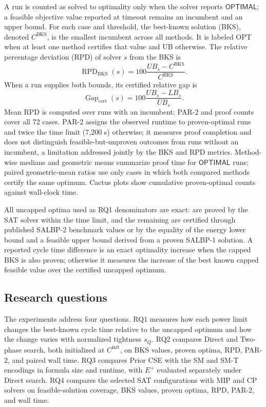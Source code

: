 \documentclass[]{interact}
\theoremstyle{plain}
\theoremstyle{definition}
\theoremstyle{remark}
\newcommand{\Cinit}{C^{\mathrm{init}}}
\newcommand{\Status}[1]{\ensuremath{\mathsf{#1}}}
\begin{document}
A run is counted as solved to optimality only when the solver reports \Status{OPTIMAL}; a feasible objective value reported at timeout remains an incumbent and an upper bound. For each case and threshold, the best-known solution (BKS), denoted $C^{\mathrm{BKS}}$, is the smallest incumbent across all methods. It is labeled OPT when at least one method certifies that value and UB otherwise. The relative percentage deviation (RPD) of solver $s$ from the BKS is
\begin{equation}
\operatorname{RPD}_{\mathrm{BKS}}(s)=
100\frac{UB_s-C^{\mathrm{BKS}}}{C^{\mathrm{BKS}}}.
\label{eq:rpd-bks}
\end{equation}
When a run supplies both bounds, its certified relative gap is
\begin{equation}
\operatorname{Gap}_{\mathrm{cert}}(s)=
100\frac{UB_s-LB_s}{UB_s}.
\label{eq:cert-gap}
\end{equation}
Mean RPD is computed over runs with an incumbent; PAR-2 and proof counts cover all 72 cases. PAR-2 assigns the observed runtime to proven-optimal runs and twice the time limit (7,200 s) otherwise; it measures proof completion and does not distinguish feasible-but-unproven outcomes from runs without an incumbent, a limitation addressed jointly by the BKS and RPD metrics. Method-wise medians and geometric means summarize proof time for \Status{OPTIMAL} runs; paired geometric-mean ratios use only cases in which both compared methods certify the same optimum. Cactus plots show cumulative proven-optimal counts against wall-clock time.

All \NoPeakOptCount{} uncapped optima used as RQ1 denominators are exact: \NoPeakSATProvenCount{} are proved by the SAT solver within the time limit, and the remaining \NoPeakExternalOnlyCount{} are certified through published SALBP-2 benchmark values \citep{SchollBenchmark1993} or by the equality of the energy lower bound and a feasible upper bound derived from a proven SALBP-1 solution. A reported cycle time difference is an exact optimality increase when the capped BKS is also proven; otherwise it measures the increase of the best known capped feasible value over the certified uncapped optimum.

\subsection{Research questions}

The experiments address four questions. RQ1 measures how each power limit changes the best-known cycle time relative to the uncapped optimum and how the change varies with normalized tightness $s_Q$. RQ2 compares Direct and Two-phase search, both initialized at $\Cinit$, on BKS values, proven optima, RPD, PAR-2, and paired wall time. RQ3 compares Prior CSE with the SM and SM-T encodings in formula size and runtime, with $E^+$ evaluated separately under Direct search. RQ4 compares the selected SAT configurations with MIP and CP solvers on feasible-solution coverage, BKS values, proven optima, RPD, PAR-2, and wall time.
\end{document}
